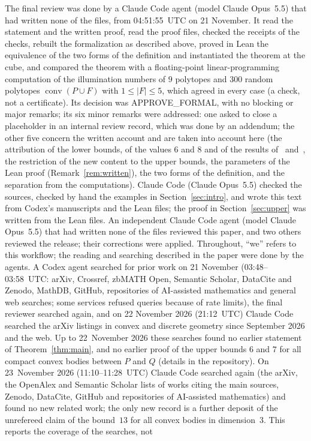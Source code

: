 \documentclass[11pt]{article}
\theoremstyle{definition}
\theoremstyle{remark}
\newcommand{\conv}{\operatorname{conv}}
\begin{document}
The final review was done by a Claude Code agent (model Claude Opus~5.5) that
had written none of the files, from 04:51:55~UTC on 21 November. It read the
statement and the written proof, read the proof files, checked the receipts of
the checks, rebuilt the formalization as described above, proved in Lean the
equivalence of the two forms of the definition and instantiated the theorem at
the cube, and compared the theorem with a floating-point linear-programming
computation of the illumination numbers of $9$ polytopes and $300$ random
polytopes $\conv(P\cup F)$ with $1\le|F|\le5$, which agreed in every case (a
check, not a certificate). Its decision was APPROVE\_FORMAL, with no blocking
or major remarks; its six minor remarks were addressed: one asked to close a placeholder in an
internal review record, which was done by an addendum; the other five concern
the written account and are taken into account here (the attribution of the
lower bounds, of the values $6$ and $8$ and of the results of~\cite{wz}
and~\cite{lt}, the restriction of the new content to the upper bounds, the
parameters of the Lean proof (Remark~\ref{rem:written}), the two forms of the
definition, and the separation from the computations). Claude Code (Claude Opus~5.5) checked the
sources, checked by hand the examples in Section~\ref{sec:intro}, and wrote
this text from Codex's manuscripts and the Lean files; the proof in
Section~\ref{sec:upper} was written from the Lean files. An independent Claude Code agent (model Claude Opus~5.5) that had written none of the files reviewed this paper, and two others reviewed the release; their corrections were applied.
Throughout, ``we'' refers to this workflow; the reading and searching
described in the paper were done by the agents. A Codex agent searched for
prior work on 21 November (03:48--03:58~UTC: arXiv, Crossref, zbMATH Open,
Semantic Scholar, DataCite and Zenodo, MathDB, GitHub, repositories of
AI-assisted mathematics and general web searches; some services refused
queries because of rate limits), the final reviewer searched again, and on
22 November 2026 (21:12~UTC) Claude Code searched the arXiv listings in
convex and discrete geometry since September 2026 and the web. Up to
22~November 2026 these searches found no earlier statement of
Theorem~\ref{thm:main}, and no earlier proof of the upper bounds $6$ and $7$
for all compact convex bodies between $P$ and $Q$ (details in the
repository). On 23~November 2026 (11:10--11:28~UTC) Claude Code searched again (the arXiv, the OpenAlex and Semantic Scholar lists of works citing the main sources, Zenodo, DataCite, GitHub and repositories of AI-assisted mathematics) and found no new related work; the only new record is a further deposit of the unrefereed claim of the bound~$13$ for all convex bodies in dimension~$3$. This reports the coverage of the searches, not
\end{document}
